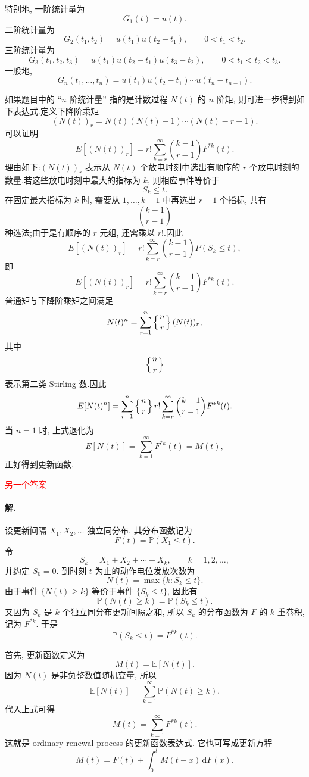 ﻿\documentclass[UTF8,  zihao=-4]{ctexart}
\begin{document}
特别地,  一阶统计量为
\[
G_1(t)=u(t).
\]
二阶统计量为
\[
G_2(t_1,  t_2)
=
u(t_1)u(t_2-t_1),  
\qquad 0<t_1<t_2.
\]
三阶统计量为
\[
G_3(t_1,  t_2,  t_3)
=
u(t_1)u(t_2-t_1)u(t_3-t_2),  
\qquad 0<t_1<t_2<t_3.
\]
一般地,  
\[
G_n(t_1,  \ldots,  t_n)
=
u(t_1)u(t_2-t_1)\cdots u(t_n-t_{n-1})
.
\]

如果题目中的 ``$n$ 阶统计量'' 指的是计数过程 $N(t)$ 的 $n$ 阶矩,  则可进一步得到如下表达式.定义下降阶乘矩
\[
(N(t))_r
=
N(t)(N(t)-1)\cdots(N(t)-r+1).
\]
可以证明
\[
E[(N(t))_r]
=
r!
\sum_{k=r}^{\infty}
\binom{k-1}{r-1}
F^{*k}(t)
.
\]
理由如下:$(N(t))_r$ 表示从 $N(t)$ 个放电时刻中选出有顺序的 $r$ 个放电时刻的数量.若这些放电时刻中最大的指标为 $k$,  则相应事件等价于
\[
S_k\leq t.
\]
在固定最大指标为 $k$ 时,  需要从 $1,  \ldots,  k-1$ 中再选出 $r-1$ 个指标,  共有
\[
\binom{k-1}{r-1}
\]
种选法;由于是有顺序的 $r$ 元组,  还需乘以 $r!$.因此
\[
E[(N(t))_r]
=
r!
\sum_{k=r}^{\infty}
\binom{k-1}{r-1}
P(S_k\leq t),  
\]
即
\[
E[(N(t))_r]
=
r!
\sum_{k=r}^{\infty}
\binom{k-1}{r-1}
F^{*k}(t).
\]
普通矩与下降阶乘矩之间满足
\[
N(t)^n
=
\sum_{r=1}^{n}
\left\{ {n\atop r} \right\}
(N(t))_r,  
\]
其中
\[
\left\{ {n\atop r} \right\}
\]
表示第二类 Stirling 数.因此
\[
E[N(t)^n]
=
\sum_{r=1}^{n}
\left\{ {n\atop r} \right\}
r!
\sum_{k=r}^{\infty}
\binom{k-1}{r-1}
F^{*k}(t)
.
\]
当 $n=1$ 时,  上式退化为
\[
E[N(t)]
=
\sum_{k=1}^{\infty}F^{*k}(t)
=
M(t),  
\]
正好得到更新函数.

\textcolor{red}{另一个答案}

\paragraph{解.}
设更新间隔 \(X_1,  X_2, \ldots\) 独立同分布,  其分布函数记为
\[
    F(t)=\mathbb P(X_1\leq t).
\]
令
\[
    S_k=X_1+X_2+\cdots+X_k, \qquad k=1,  2, \ldots, 
\]
并约定 \(S_0=0\). 到时刻 \(t\) 为止的动作电位发放次数为
\[
    N(t)=\max\{k: S_k\leq t\}.
\]
由于事件 \(\{N(t)\geq k\}\) 等价于事件 \(\{S_k\leq t\}\),  因此有
\[
    \mathbb P(N(t)\geq k)
    =
    \mathbb P(S_k\leq t).
\]
又因为 \(S_k\) 是 \(k\) 个独立同分布更新间隔之和,  所以 \(S_k\) 的分布函数为
\(F\) 的 \(k\) 重卷积,  记为 \(F^{*k}\). 于是
\[
    \mathbb P(S_k\leq t)=F^{*k}(t).
\]

首先,  更新函数定义为
\[
    M(t)=\mathbb E[N(t)].
\]
因为 \(N(t)\) 是非负整数值随机变量,  所以
\[
    \mathbb E[N(t)]
    =
    \sum_{k=1}^{\infty}\mathbb P(N(t)\geq k).
\]
代入上式可得
\[
    M(t)
    =
    \sum_{k=1}^{\infty}F^{*k}(t).
\]
这就是 ordinary renewal process 的更新函数表达式. 它也可写成更新方程
\[
    M(t)=F(t)+\int_0^t M(t-x)\, \mathrm dF(x).
\]
\end{document}
